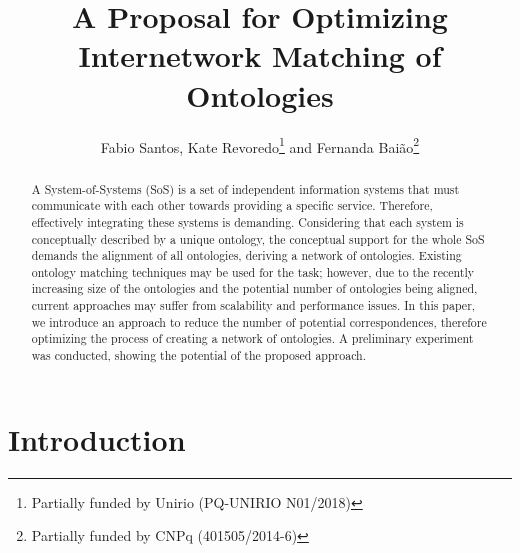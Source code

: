 \documentclass{llncs}
\begin{document}
\title{A Proposal for Optimizing Internetwork Matching of Ontologies}


\author{Fabio Santos, Kate Revoredo\thanks{Partially funded by Unirio (PQ-UNIRIO N01/2018)} and Fernanda Baião\thanks{Partially funded by CNPq (401505/2014-6)}}

\maketitle
{}
\begin{abstract}

A System-of-Systems (SoS) is a set of independent information systems that must communicate with each other towards providing a specific service. Therefore, effectively integrating these systems is demanding. Considering that each system is conceptually described by a unique ontology, the conceptual support for the whole SoS demands the alignment of all ontologies, deriving a network of ontologies. Existing ontology matching techniques may be used for the task; however, due to the recently increasing size of the ontologies and the potential number of ontologies being aligned, current approaches may suffer from scalability and performance issues. In this paper, we introduce an approach to reduce the number of potential correspondences, therefore optimizing the process of creating a network of ontologies. A preliminary experiment was conducted, showing the potential of the proposed approach. 
\end{abstract}

\section{Introduction} \label{sec:introduction}
\end{document}
